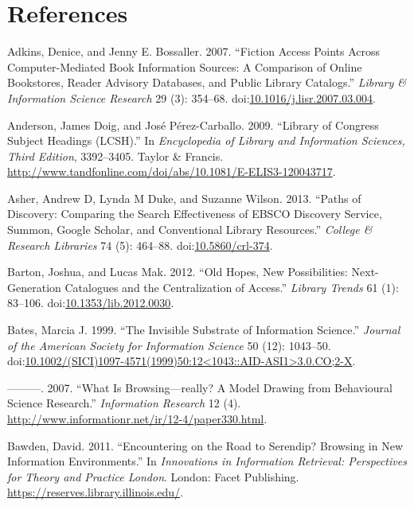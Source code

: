 \documentclass[]{article}
\begin{document}
\section*{References}\label{references}

\hypertarget{refs}{}
\hypertarget{ref-adkinsux5ffictionux5f2007}{}
Adkins, Denice, and Jenny E. Bossaller. 2007. ``Fiction Access Points
Across Computer-Mediated Book Information Sources: A Comparison of
Online Bookstores, Reader Advisory Databases, and Public Library
Catalogs.'' \emph{Library \& Information Science Research} 29 (3):
354--68.
doi:\href{https://doi.org/10.1016/j.lisr.2007.03.004}{10.1016/j.lisr.2007.03.004}.

\hypertarget{ref-andersonux5flibraryux5f2009}{}
Anderson, James Doig, and José Pérez-Carballo. 2009. ``Library of
Congress Subject Headings (LCSH).'' In \emph{Encyclopedia of Library and
Information Sciences, Third Edition}, 3392--3405. Taylor \& Francis.
\url{http://www.tandfonline.com/doi/abs/10.1081/E-ELIS3-120043717}.

\hypertarget{ref-asherux5fpathsux5f2013}{}
Asher, Andrew D, Lynda M Duke, and Suzanne Wilson. 2013. ``Paths of
Discovery: Comparing the Search Effectiveness of EBSCO Discovery
Service, Summon, Google Scholar, and Conventional Library Resources.''
\emph{College \& Research Libraries} 74 (5): 464--88.
doi:\href{https://doi.org/10.5860/crl-374}{10.5860/crl-374}.

\hypertarget{ref-bartonux5foldux5f2012}{}
Barton, Joshua, and Lucas Mak. 2012. ``Old Hopes, New Possibilities:
Next-Generation Catalogues and the Centralization of Access.''
\emph{Library Trends} 61 (1): 83--106.
doi:\href{https://doi.org/10.1353/lib.2012.0030}{10.1353/lib.2012.0030}.

\hypertarget{ref-batesux5finvisibleux5f1999}{}
Bates, Marcia J. 1999. ``The Invisible Substrate of Information
Science.'' \emph{Journal of the American Society for Information
Science} 50 (12): 1043--50.
doi:\href{https://doi.org/10.1002/(SICI)1097-4571(1999)50:12\%3C1043::AID-ASI1\%3E3.0.CO;2-X}{10.1002/(SICI)1097-4571(1999)50:12\textless{}1043::AID-ASI1\textgreater{}3.0.CO;2-X}.

\hypertarget{ref-batesux5fwhatux5f2007}{}
---------. 2007. ``What Is Browsing---really? A Model Drawing from
Behavioural Science Research.'' \emph{Information Research} 12 (4).
\url{http://www.informationr.net/ir/12-4/paper330.html}.

\hypertarget{ref-bawdenux5fencounteringux5f2011}{}
Bawden, David. 2011. ``Encountering on the Road to Serendip? Browsing in
New Information Environments.'' In \emph{Innovations in Information
Retrieval: Perspectives for Theory and Practice London}. London: Facet
Publishing. \url{https://reserves.library.illinois.edu/}.
\end{document}
